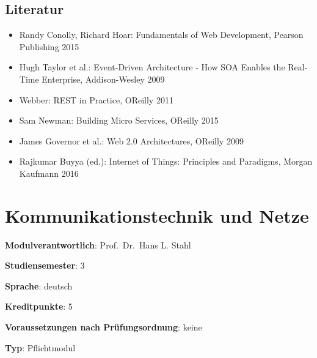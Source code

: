 \section*{Literatur\label{/mi-2017/modulbeschreibungen-bachelor/BA_Grundlagen_des_Web}}\label{literaturpathlabelmi-2017modulbeschreibungen-bachelorbaux5fgrundlagenux5fdesux5fweb}

\begin{itemize}
\tightlist
\item
  Randy Conolly, Richard Hoar: Fundamentals of Web Development, Pearson
  Publishing 2015
\item
  Hugh Taylor et al.: Event-Driven Architecture - How SOA Enables the
  Real-Time Enterprise, Addison-Wesley 2009
\item
  Webber: REST in Practice, OReilly 2011
\item
  Sam Newman: Building Micro Services, OReilly 2015
\item
  James Governor et al.: Web 2.0 Architectures, OReilly 2009
\item
  Rajkumar Buyya (ed.): Internet of Things: Principles and Paradigms,
  Morgan Kaufmann 2016
\end{itemize}

\chapter{Kommunikationstechnik und
Netze\label{/mi-2017/modulbeschreibungen-bachelor/BA_KommunikationstechnikundNetze}}\label{kommunikationstechnik-und-netzepathlabelmi-2017modulbeschreibungen-bachelorbaux5fkommunikationstechnikundnetze}

\begin{modulHead}
\textbf{Modulverantwortlich}: Prof.~Dr.~Hans L.
Stahl
\end{modulHead}
\begin{modulHead}
\textbf{Studiensemester}:
3
\end{modulHead}
\begin{modulHead}
\textbf{Sprache}:
deutsch
\end{modulHead}
\begin{modulHead}
\textbf{Kreditpunkte}:
5
\end{modulHead}
\begin{modulHead}
\textbf{Voraussetzungen nach
Prüfungsordnung}: keine
\end{modulHead}
\begin{modulHead}
\textbf{Typ}:
Pflichtmodul
\end{modulHead}


